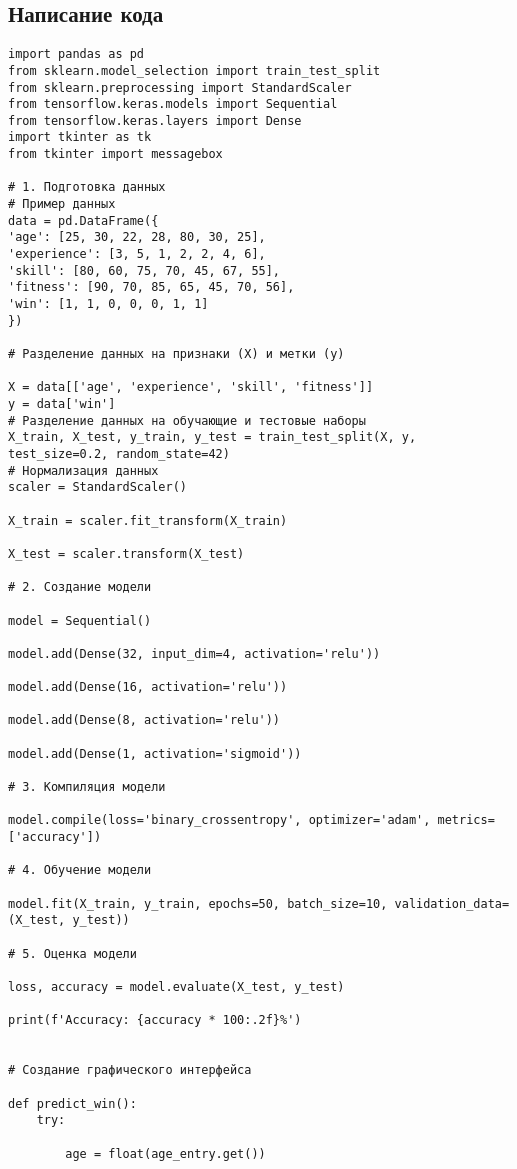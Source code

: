 \documentclass[12pt,a4paper]{article}
\begin{document}
\subsection{Написание кода}
\begin{verbatim}
import pandas as pd
from sklearn.model_selection import train_test_split
from sklearn.preprocessing import StandardScaler
from tensorflow.keras.models import Sequential
from tensorflow.keras.layers import Dense
import tkinter as tk
from tkinter import messagebox

# 1. Подготовка данных
# Пример данных
data = pd.DataFrame({
'age': [25, 30, 22, 28, 80, 30, 25],
'experience': [3, 5, 1, 2, 2, 4, 6],
'skill': [80, 60, 75, 70, 45, 67, 55],
'fitness': [90, 70, 85, 65, 45, 70, 56],
'win': [1, 1, 0, 0, 0, 1, 1]
})

# Разделение данных на признаки (X) и метки (y)

X = data[['age', 'experience', 'skill', 'fitness']]
y = data['win']
# Разделение данных на обучающие и тестовые наборы
X_train, X_test, y_train, y_test = train_test_split(X, y, test_size=0.2, random_state=42)
# Нормализация данных
scaler = StandardScaler()

X_train = scaler.fit_transform(X_train)

X_test = scaler.transform(X_test)

# 2. Создание модели

model = Sequential()

model.add(Dense(32, input_dim=4, activation='relu'))

model.add(Dense(16, activation='relu'))

model.add(Dense(8, activation='relu'))

model.add(Dense(1, activation='sigmoid'))

# 3. Компиляция модели

model.compile(loss='binary_crossentropy', optimizer='adam', metrics=['accuracy'])

# 4. Обучение модели

model.fit(X_train, y_train, epochs=50, batch_size=10, validation_data=(X_test, y_test))

# 5. Оценка модели

loss, accuracy = model.evaluate(X_test, y_test)

print(f'Accuracy: {accuracy * 100:.2f}%')


# Создание графического интерфейса

def predict_win():
    try:

        age = float(age_entry.get())


\end{verbatim}
\end{document}
